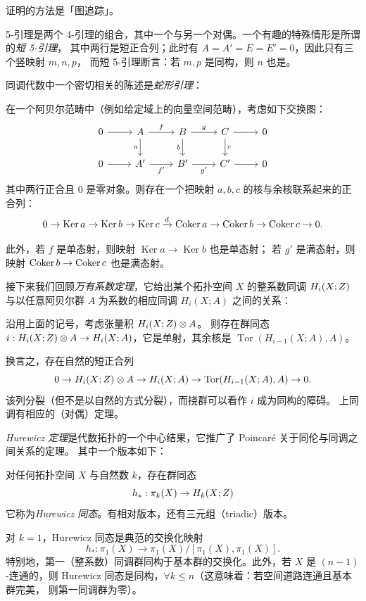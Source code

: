 证明的方法是「图追踪」。

5-引理是两个 4-引理的组合，其中一个与另一个对偶。一个有趣的特殊情形是所谓的\emph{短 5-引理}，
其中两行是短正合列；此时有 $A = A' = E = E' = 0$，因此只有三个竖映射 $m, n, p$，
而短 5-引理断言：若 $m, p$ 是同构，则 $n$ 也是。

同调代数中一个密切相关的陈述是\emph{蛇形引理}：

 在一个阿贝尔范畴中（例如给定域上的向量空间范畴），考虑如下交换图：
\[
  \begin{tikzcd}
    0 \arrow[r] & A \arrow[r,"f"] \arrow[d,"a"'] & B \arrow[r,"g"] \arrow[d,"b"'] & C \arrow[r] \arrow[d,"c"] & 0 \\
    0 \arrow[r] & A' \arrow[r,"{f'}"'] & B' \arrow[r,"{g'}"'] & C' \arrow[r] & 0
  \end{tikzcd}
\]
其中两行正合且 $0$ 是零对象。则存在一个把映射 $a, b, c$ 的核与余核联系起来的正合列：
\[
  0 \to \operatorname{Ker} a \to \operatorname{Ker} b \to \operatorname{Ker} c
  \xrightarrow{d} \operatorname{Coker} a \to \operatorname{Coker} b \to \operatorname{Coker} c \to 0.
\]

此外，若 $f$ 是单态射，则映射 $\operatorname{Ker} a \to \operatorname{Ker} b$ 也是单态射；
若 $g'$ 是满态射，则映射 $\operatorname{Coker} b \to \operatorname{Coker} c$ 也是满态射。

接下来我们回顾\emph{万有系数定理}，它给出某个拓扑空间 $X$ 的整系数同调 $H_i(X; Z)$
与以任意阿贝尔群 $A$ 为系数的相应同调 $H_i(X; A)$ 之间的关系：

 沿用上面的记号，考虑张量积 $H_i(X; Z) \otimes A$。
则存在群同态 $i : H_i(X; Z) \otimes A \to H_i(X; A)$，它是单射，其余核是
$\operatorname{Tor}(H_{i-1}(X; A), A)$。

换言之，存在自然的短正合列
\[
  0 \to H_i(X; Z) \otimes A \to H_i(X; A) \to \operatorname{Tor}(H_{i-1}(X; A), A) \to 0.
\]
该列分裂（但不是以自然的方式分裂），而挠群可以看作 $i$ 成为同构的障碍。
上同调有相应的（对偶）定理。

\emph{Hurewicz 定理}是代数拓扑的一个中心结果，它推广了 Poincaré 关于同伦与同调之间关系的定理。
其中一个版本如下：

 对任何拓扑空间 $X$ 与自然数 $k$，存在群同态
\[
  h_* : \pi_k(X) \to H_k(X; Z)
\]
它称为\emph{Hurewicz 同态}。有相对版本，还有三元组（triadic）版本。

对 $k = 1$，Hurewicz 同态是典范的交换化映射
\[
  h_* : \pi_1(X) \to \pi_1(X)/[\pi_1(X), \pi_1(X)].
\]
特别地，第一（整系数）同调群同构于基本群的交换化。此外，若 $X$ 是 $(n-1)$-连通的，则%
Hurewicz 同态是同构，$\forall k \leq n$（这意味着：若空间道路连通且基本群完美，
则第一同调群为零）。

